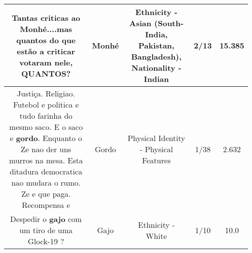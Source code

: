 \documentclass[11pt]{article}
\newlength\mylength
\begin{document}
\begin{center}
\begin{longtable}{|C{.65\mylength}|C{.30\mylength}|C{.12\mylength}|C{.12\mylength}|C{.12\mylength}|}
  \small Tantas criticas ao \textbf{M\textbf{onhé}}....mas quantos do que estão a criticar votaram nele, QUANTOS?\normalsize   & Monhé & Ethnicity - Asian (South- India, Pakistan, Bangladesh), Nationality - Indian & 2/13 & 15.385 \\  \hline
  \small Justiça. Religiao. Futebol e politica e tudo farinha do mesmo saco. E o saco e \textbf{gordo}. Enquanto o Ze nao der uns murros na mesa. Esta ditadura democratica nao mudara o rumo. Ze e que paga. Recompensa e\normalsize   & Gordo & Physical Identity - Physical Features & 1/38 & 2.632 \\  \hline
  \small Despedir o \textbf{gajo} com um tiro de uma Glock-19 ?\normalsize   & Gajo & Ethnicity - White & 1/10 & 10.0 \\  \hline
  
\end{longtable}
\end{center}
\end{document}
